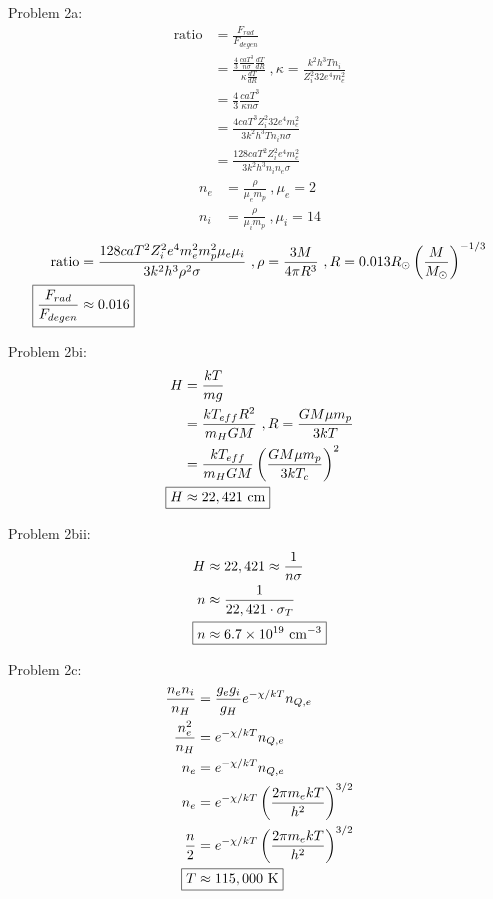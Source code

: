 \documentclass[10pt,letter,preprint]{aastex}
\newcommand{\rp}{\right)}
\newcommand{\lp}{\left(}
\newcommand{\mfrac}{\lp \frac{M}{M_\odot}\rp}
\begin{document}
Problem 2a:\\
\begin{align}
\textrm{ratio} &= \frac{F_{rad}}{F_{degen}}\\
&= \frac{\frac{4}{3}\frac{caT^3}{n\sigma} \frac{dT}{dR} }{\kappa\frac{dT}{dR}}~,\kappa = \frac{k^2h^3Tn_i}{Z_i^2 32e^4m_e^2}\\
&= \frac{4}{3}\frac{caT^3}{\kappa n\sigma}\\
&= \frac{4caT^3Z_i^2 32 e^4 m_e^2}{3k^2h^3Tn_i n\sigma}\\
&= \frac{128 caT^2 Z_i^2 e^4 m_e^2}{3k^2h^3 n_i n_e \sigma}
\end{align}
\begin{align}
n_e &= \frac{\rho}{\mu_e m_p}~,\mu_e = 2\\
n_i &= \frac{\rho}{\mu_i m_p}~,\mu_i = 14
\end{align}
\begin{align}
\textrm{ratio} &= \frac{128 caT^2 Z_i^2 e^4 m_e^2m_p^2 \mu_e \mu_i}{3k^2h^3 \rho^2 \sigma}~,\rho = \frac{3M}{4 \pi R^3}~,R =0.013 R_\odot \mfrac^{-1/3}\\
\Aboxed{\frac{F_{rad}}{F_{degen}}&\approx 0.016}
\end{align}


Problem 2bi:\\
\begin{align}
H &= \frac{kT}{mg}\\
&= \frac{kT_{eff}R^2}{m_H GM}~,R = \frac{GM\mu m_p}{3kT}\\
&= \frac{kT_{eff}}{m_H GM} \lp \frac{GM\mu m_p}{3kT_c} \rp^2\\
\Aboxed{H &\approx 22,421 \textrm{ cm}}
\end{align}

Problem 2bii:\\
\begin{align}
H &\approx 22,421 \approx \frac{1}{n\sigma}\\
n &\approx \frac{1}{22,421 \cdot \sigma_T}\\
\Aboxed{n &\approx 6.7 \times 10^{19} \textrm{ cm}^{-3}}
\end{align}

\newpage
Problem 2c:\\
\begin{align}
\frac{n_en_i}{n_H} &= \frac{g_eg_i}{g_H}e^{-\chi/kT}n_{Q,e}\\
\frac{n_e^2}{n_H} &= e^{-\chi/kT}n_{Q,e}\\
n_e &= e^{-\chi/kT}n_{Q,e}\\
n_e &= e^{-\chi/kT} \lp \frac{2 \pi m_e kT}{h^2} \rp^{3/2} \\
\frac{n}{2}&= e^{-\chi/kT} \lp \frac{2 \pi m_e kT}{h^2} \rp^{3/2} \\
\Aboxed{T &\approx 115,000 \textrm{ K}}
\end{align}
\end{document}
